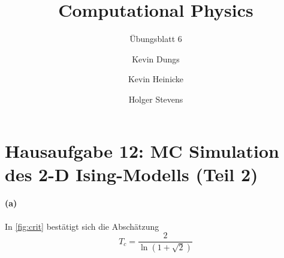 \documentclass{scrartcl}
\author{Kevin Dungs \and Kevin Heinicke \and Holger Stevens}
\title{Computational Physics}
\subtitle{Übungsblatt 6}
\begin{document}
\maketitle

\section*{Hausaufgabe 12: MC Simulation des 2-D Ising-Modells (Teil 2)}

\paragraph{(a)} In \autoref{fig:crit} bestätigt sich die Abschätzung
\begin{equation}
  T_c = \frac{2}{\ln\left(1 + \sqrt{2}\right)}
\end{equation}
\end{document}
